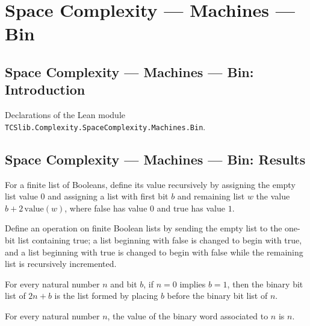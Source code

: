 \section{Space Complexity --- Machines --- Bin}
\subsection*{Space Complexity --- Machines --- Bin: Introduction}

Declarations of the Lean module \texttt{TCSlib.Complexity.SpaceComplexity.Machines.Bin}.

\subsection*{Space Complexity --- Machines --- Bin: Results}

\begin{definition}
\label{Complexity.LogProg.bitsVal}
\leanok
For a finite list of Booleans, define its value recursively by assigning the empty list
value $0$ and assigning a list with first bit $b$ and remaining list $w$ the value
$b+2\,\mathrm{value}(w)$, where false has value $0$ and true has value $1$.
\end{definition}

\begin{definition}
\label{Complexity.LogProg.incW}
\leanok
Define an operation on finite Boolean lists by sending the empty list to the one-bit
list containing true; a list beginning with false is changed to begin with true, and a
list beginning with true is changed to begin with false while the remaining list is
recursively incremented.
\end{definition}

\begin{lemma}
\label{Complexity.LogProg.bits_two_mul_add}
\leanok
{}
For every natural number $n$ and bit $b$, if $n=0$ implies $b=1$, then the binary bit
list of $2n+b$ is the list formed by placing $b$ before the binary bit list of $n$.
\end{lemma}

\begin{lemma}
\label{Complexity.LogProg.bitsVal_bits}
\leanok
{}
For every natural number $n$, the value of the binary word associated to $n$ is $n$.
\end{lemma}

